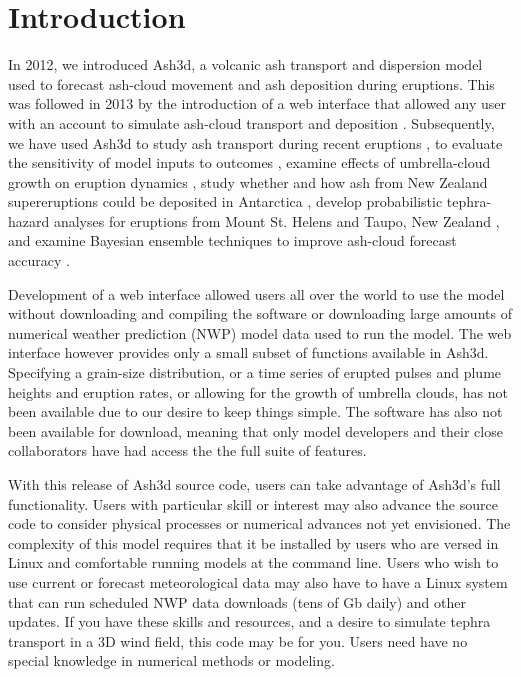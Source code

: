 \chapter{Introduction}\label{ChapIntro}
In 2012, we introduced Ash3d, a volcanic ash transport and dispersion model used to forecast ash-cloud movement and ash deposition during eruptions. \cite{Schwaiger12}  This was followed in 2013 by the introduction of a web interface that allowed any user with an account to simulate ash-cloud transport and deposition \cite{Mastin13b}.  Subsequently, we have used Ash3d to study ash transport during recent eruptions \cite{Mastin13a}, to evaluate the sensitivity of model inputs to outcomes \cite{Mastin16}, examine effects of umbrella-cloud growth on eruption dynamics \cite{Mastin14,Mastin20a},  study whether and how ash from New Zealand supereruptions could be deposited in Antarctica \cite{Dunbar17}, develop probabilistic tephra-hazard analyses for eruptions from Mount St. Helens \cite{Mastin20b} and Taupo, New Zealand \cite{Barker19}, and examine Bayesian ensemble techniques to improve ash-cloud forecast accuracy \cite{Denlinger12}.

Development of a web interface allowed users all over the world to use the model without downloading and compiling the software or downloading large amounts of numerical weather prediction (NWP) model data used to run the model.  The web interface however provides only a small subset of functions available in Ash3d.  Specifying a grain-size distribution, or a time series of erupted pulses and plume heights and eruption rates, or allowing for the growth of umbrella clouds, has not been available due to our desire to keep things simple.  The software has also not been available for download, meaning that only model developers and their close collaborators have had access the the full suite of features.

With this release of Ash3d source code, users can take advantage of Ash3d's full functionality.  Users with particular skill or interest may also advance the source code to consider physical processes or numerical advances not yet envisioned.  The complexity of this model requires that it be installed by users who are versed in Linux and comfortable running models at the command line.  Users who wish to use current or forecast meteorological data may also have to have a Linux system that can run scheduled NWP data downloads (tens of Gb daily) and other updates.  If you have these skills and resources, and a desire to simulate tephra transport in a 3D wind field, this code may be for you. Users need have no special knowledge in numerical methods or modeling.

